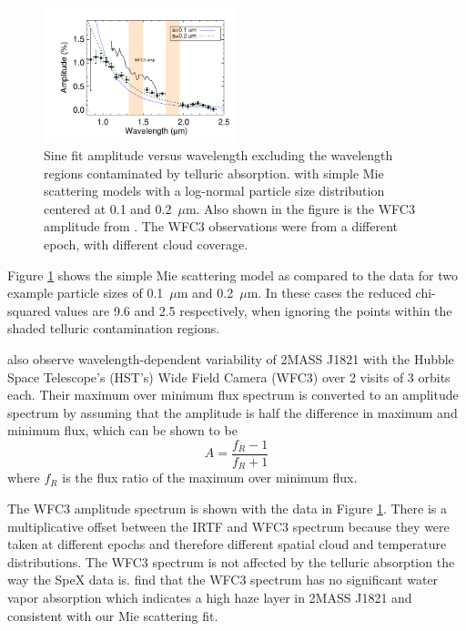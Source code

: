 \documentclass[twocolumn]{aastex6}
\begin{document}
\begin{figure}
\begin{centering}
\includegraphics[width=0.5\textwidth]{amp_vs_wavl_j1821_mie_sc.pdf}
\caption{Sine fit amplitude versus wavelength excluding the wavelength regions contaminated by telluric absorption. with simple Mie scattering models with a log-normal particle size distribution centered at 0.1 and 0.2~$\mu$m. Also shown in the figure is the WFC3 amplitude from \citet{2015ApJ...798L..13Y}. The WFC3 observations were from a different epoch, with different cloud coverage.}\label{fig:ampspec1821mie}
\end{centering}
\end{figure}

Figure \ref{fig:ampspec1821mie} shows the simple Mie scattering model as compared to the data for two example particle sizes of 0.1~$\mu$m and 0.2~$\mu$m.
In these cases the reduced chi-squared values are 9.6 and 2.5 respectively, when ignoring the points within the shaded telluric contamination regions.

\citet{2015ApJ...798L..13Y} also observe wavelength-dependent variability of 2MASS J1821 with the Hubble Space Telescope's (HST's) Wide Field Camera (WFC3) over 2 visits of 3 orbits each.
Their maximum over minimum flux spectrum is converted to an amplitude spectrum by assuming that the amplitude is half the difference in maximum and minimum flux, which can be shown to be 
\begin{equation}
A  = \frac{f_R - 1}{f_R + 1}
\end{equation}\label{eq:ampFromRatio}
where $f_R$ is the flux ratio of the maximum over minimum flux.

The WFC3 amplitude spectrum is shown with the data in Figure \ref{fig:ampspec1821mie}.
There is a multiplicative offset between the IRTF and WFC3 spectrum because they were taken at different epochs and therefore different spatial cloud and temperature distributions.
The WFC3 spectrum is not affected by the telluric absorption the way the SpeX data is.
\citet{2015ApJ...798L..13Y} find that the WFC3 spectrum has no significant water vapor absorption which indicates a high haze layer in 2MASS J1821 and consistent with our Mie scattering fit.
\end{document}
